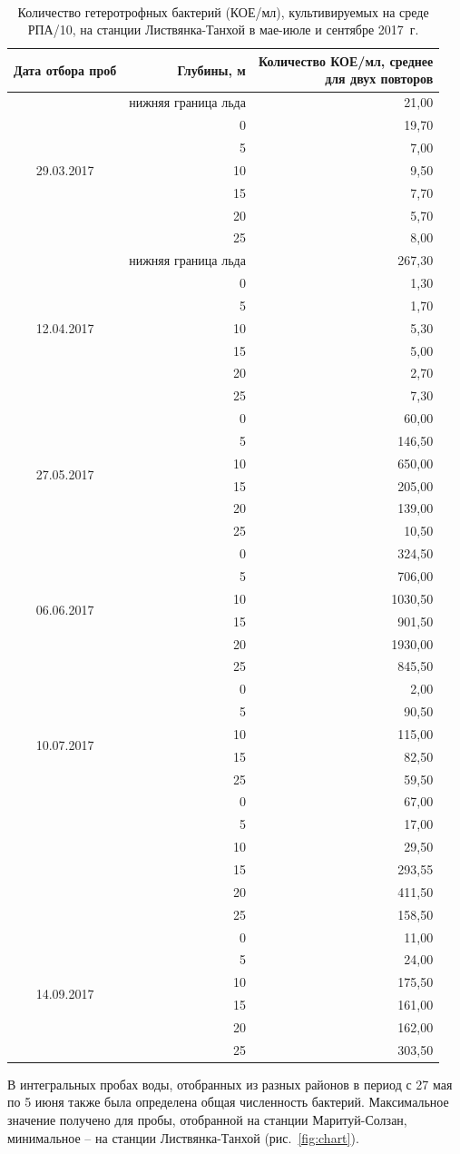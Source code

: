 \documentclass[a4paper,12pt,openany,final]{extreport}
\def\oldcaption{} \let\oldcaption=\caption
\def\caption{\stepcounter{captionsnum}\oldcaption}
\newcommand\T{\rule{0pt}{2.6ex}}       %
\newcommand{\BC}[2]{%
  \begin{minipage}[c]{#1}
    \raggedright\T
    #2
  \end{minipage}
}
\begin{document}
\begin{table}
\caption{Количество гетеротрофных бактерий (КОЕ/мл), культивируемых на
среде РПА/10, на станции Листвянка-Танхой в мае-июле и сентябре 2017~г.}\label{table:2}

{\tt\small%
  \setlength{\extrarowheight}{-0.2em}
  \begin{tabular*}{\textwidth}{|c|r|@{\extracolsep{\fill}}r|}
\hline
\rm Дата отбора проб & \BC{4cm}{\centering\rm Глубины, м} & \BC{0.45\textwidth}{\rm\centering Количество КОЕ/мл, среднее\\[-0.2em] для двух
повторов}\\
\hline
\multirow{7}{*}{29.03.2017} & \rm нижняя граница льда & 21,00\tabularnewline
& 0 & 19,70\tabularnewline
& 5 & 7,00\tabularnewline
& 10 & 9,50\tabularnewline
& 15 & 7,70\tabularnewline
& 20 & 5,70\tabularnewline
  & 25 & 8,00\tabularnewline
         \hline
\multirow{7}{*}{12.04.2017} & \rm нижняя граница льда & 267,30\tabularnewline
& 0 & 1,30\tabularnewline
& 5 & 1,70\tabularnewline
& 10 & 5,30\tabularnewline
& 15 & 5,00\tabularnewline
& 20 & 2,70\tabularnewline
  & 25 & 7,30\tabularnewline
         \hline
\multirow{6}{*}{27.05.2017} & 0 & 60,00\tabularnewline
& 5 & 146,50\tabularnewline
& 10 & 650,00\tabularnewline
& 15 & 205,00\tabularnewline
& 20 & 139,00\tabularnewline
& 25 & 10,50\tabularnewline
         \hline
\multirow{6}{*}{06.06.2017} & 0 & 324,50\tabularnewline
& 5 & 706,00\tabularnewline
& 10 & 1030,50\tabularnewline
& 15 & 901,50\tabularnewline
& 20 & 1930,00\tabularnewline
& 25 & 845,50\tabularnewline
         \hline
\multirow{6}{*}{10.07.2017} & 0 & 2,00\tabularnewline
& 5 & 90,50\tabularnewline
& 10 & 115,00\tabularnewline
& 15 & 82,50\tabularnewline
& 25 & 59,50\tabularnewline
         \hline
\multirow{6}{*}{03.09.2017} & 0 & 67,00\tabularnewline
& 5 & 17,00\tabularnewline
& 10 & 29,50\tabularnewline
& 15 & 293,55\tabularnewline
& 20 & 411,50\tabularnewline
& 25 & 158,50\tabularnewline
         \hline
\multirow{6}{*}{14.09.2017} & 0 & 11,00\tabularnewline
& 5 & 24,00\tabularnewline
& 10 & 175,50\tabularnewline
& 15 & 161,00\tabularnewline
& 20 & 162,00\tabularnewline
& 25 & 303,50\tabularnewline
\hline
\end{tabular*}}
\end{table}

В интегральных пробах воды, отобранных из разных районов в период с 27
мая по 5 июня также была определена общая численность бактерий.
Максимальное значение получено для пробы, отобранной на станции
Маритуй-Солзан, минимальное -- на станции Листвянка-Танхой (рис.~\ref{fig:chart}).
\end{document}
